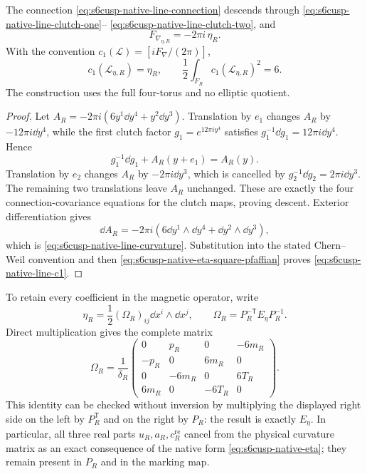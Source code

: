 \begin{proposition}
\label{prop:s6cusp-native-line-bundle}
The connection \eqref{eq:s6cusp-native-line-connection} descends through
\eqref{eq:s6cusp-native-line-clutch-one}--
\eqref{eq:s6cusp-native-line-clutch-two}, and
\begin{equation}\label{eq:s6cusp-native-line-curvature}
 F_{\nabla_{\eta,R}}=-2\pi i\,\eta_R.
\end{equation}
With the convention
\(c_1(\mathcal L)=[iF_\nabla/(2\pi)]\),
\begin{equation}\label{eq:s6cusp-native-line-c1}
 c_1(\mathcal L_{\eta,R})=\eta_R,
 \qquad
 \frac12\int_{F_R}c_1(\mathcal L_{\eta,R})^2=6.
\end{equation}
The construction uses the full four-torus and no elliptic quotient.
\end{proposition}

\begin{proof}
Let \(A_R=-2\pi i(6y^1\dd y^4+y^2\dd y^3)\).  Translation by
\(e_1\) changes \(A_R\) by \(-12\pi i\dd y^4\), while the first clutch
factor \(g_1=e^{12\pi i y^4}\) satisfies
\(g_1^{-1}\dd g_1=12\pi i\dd y^4\).  Hence
\[
 g_1^{-1}\dd g_1+A_R(y+e_1)=A_R(y).
\]
Translation by \(e_2\) changes \(A_R\) by
\(-2\pi i\dd y^3\), which is cancelled by
\(g_2^{-1}\dd g_2=2\pi i\dd y^3\).  The remaining two translations
leave \(A_R\) unchanged.  These are exactly the four connection-covariance
equations for the clutch maps, proving descent.  Exterior differentiation
gives
\[
 \dd A_R=-2\pi i
 \left(6\dd y^1\wedge\dd y^4+
 \dd y^2\wedge\dd y^3\right),
\]
which is \eqref{eq:s6cusp-native-line-curvature}.  Substitution into the
stated Chern--Weil convention and then
\eqref{eq:s6cusp-native-eta-square-pfaffian} proves
\eqref{eq:s6cusp-native-line-c1}.
\end{proof}

To retain every coefficient in the magnetic operator, write
\begin{equation}\label{eq:s6cusp-native-physical-two-form}
 \eta_R=\frac12(\Omega_R)_{ij}\dd x^i\wedge\dd x^j,
 \qquad
 \Omega_R=P_R^{-\mathsf T}E_\eta P_R^{-1}.
\end{equation}
Direct multiplication gives the complete matrix
\begin{equation}\label{eq:s6cusp-native-physical-matrix}
 \Omega_R=\frac1{\delta_R}
 \begin{pmatrix}
 0&p_R&0&-6m_R\\
 -p_R&0&6m_R&0\\
 0&-6m_R&0&6T_R\\
 6m_R&0&-6T_R&0
 \end{pmatrix}.
\end{equation}
This identity can be checked without inversion by multiplying the displayed
right side on the left by \(P_R^{\mathsf T}\) and on the right by \(P_R\):
the result is exactly \(E_\eta\).  In particular, all three real parts
\(u_R,a_R,c_R^{\mathrm{re}}\) cancel from the physical curvature matrix as
an exact consequence of the native form \eqref{eq:s6cusp-native-eta}; they
remain present in \(P_R\) and in the marking map.

